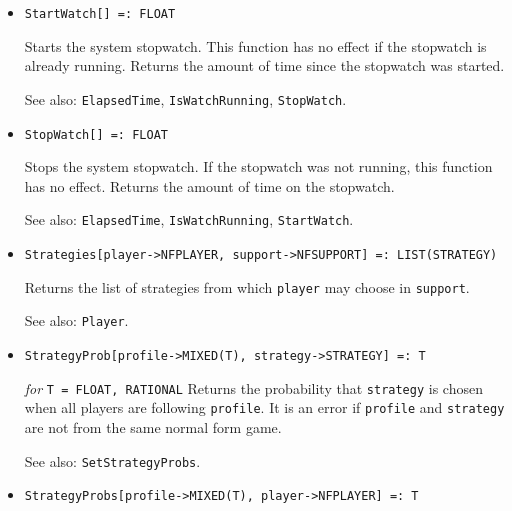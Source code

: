 \begin{itemize}
\item{}
\protect \large \begin{verbatim}
StartWatch[] =: FLOAT
\end{verbatim}\normalsize

\bd
Starts the system stopwatch.  This function has no
effect if the stopwatch is already running.
Returns the amount of time since the stopwatch was started.
\item [See also:] \verb+ElapsedTime+, \verb+IsWatchRunning+, \verb+StopWatch+.
\ed

\item{}
\protect \large \begin{verbatim}
StopWatch[] =: FLOAT
\end{verbatim}\normalsize

\bd
Stops the system stopwatch.  If the stopwatch was not
running, this function has no effect.  Returns the amount of time
on the stopwatch.
\item [See also:] \verb+ElapsedTime+, \verb+IsWatchRunning+,
\verb+StartWatch+.
\ed

\item{}
\protect \large \begin{verbatim}
Strategies[player->NFPLAYER, support->NFSUPPORT] =: LIST(STRATEGY)
\end{verbatim}\normalsize

\bd
Returns the list of strategies from which  \verb+player+ may choose
in \verb+support+.
\item [See also:] \verb+Player+. 
\ed

\item{}
\protect \large \begin{verbatim}
StrategyProb[profile->MIXED(T), strategy->STRATEGY] =: T
\end{verbatim} \normalsize

{\it for} {\tt T = FLOAT, RATIONAL}
\bd
Returns the probability that \verb+strategy+ is chosen when all
players are following \verb+profile+.  It is an error if \verb+profile+
and \verb+strategy+ are not from the same normal form game.
\item [See also:] \verb+SetStrategyProbs+.
\ed

\item{}
\protect \large \begin{verbatim}
StrategyProbs[profile->MIXED(T), player->NFPLAYER] =: T
\end{verbatim} \normalsize


\end{itemize}
